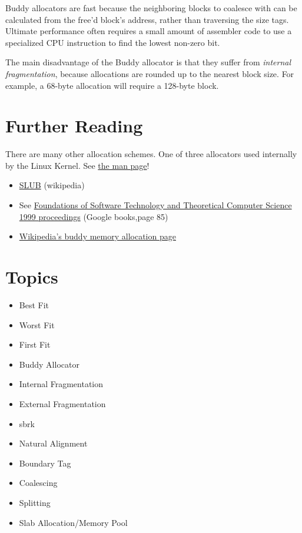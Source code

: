 Buddy allocators are fast because the neighboring blocks to coalesce with can be calculated from the free'd block's address, rather than traversing the size tags.
Ultimate performance often requires a small amount of assembler code to use a specialized CPU instruction to find the lowest non-zero bit.

The main disadvantage of the Buddy allocator is that they suffer from \emph{internal fragmentation}, because allocations are rounded up to the nearest block size. For example, a 68-byte allocation will require a 128-byte block.

\section{Further Reading}

There are many other allocation schemes. One of three allocators used internally by the Linux Kernel. See \href{http://man7.org/linux/man-pages/man3/malloc.3.html}{the man page}!

\begin{itemize}
\tightlist
\item
  \href{http://en.wikipedia.org/wiki/SLUB_\%28software\%29}{SLUB} (wikipedia)
\item
  See \href{http://books.google.com/books?id=0uHME7EfjQEC\&lpg=PP1\&pg=PA85\#v=onepage\&q\&f=false}{Foundations of Software Technology and Theoretical Computer Science 1999 proceedings} (Google books,page 85)
\item
  \href{http://en.wikipedia.org/wiki/Buddy_memory_allocation}{Wikipedia's buddy memory allocation page}
\end{itemize}

\section{Topics}

\begin{itemize}
\tightlist
\item
  Best Fit
\item
  Worst Fit
\item
  First Fit
\item
  Buddy Allocator
\item
  Internal Fragmentation
\item
  External Fragmentation
\item
  sbrk
\item
  Natural Alignment
\item
  Boundary Tag
\item
  Coalescing
\item
  Splitting
\item
  Slab Allocation/Memory Pool
\end{itemize}

